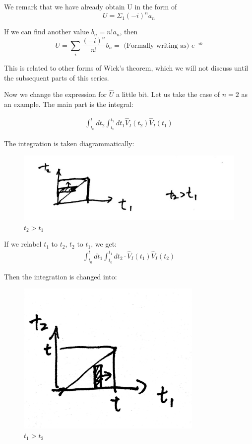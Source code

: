 \documentclass{article}
\numberwithin{equation}{subsection} %
\begin{document}
    We remark that we have already obtain U in the form of %
    $$U=\Sigma_1 (-i)^n a_n$$
    
    If we can find another value $b_n=n!a_n$, then
    $$U= \sum_i \frac{(-i)^n}{n!}b_n= \text{ (Formally writing as) }e^{-ib}$$
    
    This is related to other forms of Wick's theorem, which we will not discuss until the subsequent parts of this series.
    
    Now we change the expression for $\hat{U}$ a little bit. Let us take the case of $n=2$ as an example. The main part is the integral:
    
    \begin{align} \label{eq:n_is_21} \int_{t_0}^{t}dt_2 \int_{t_0}^{t_2} dt_1 \hat{V}_I(t_2) \hat{V}_I(t_1)
    \end{align}
    
    The integration is taken diagrammatically:

	\begin{figure}[H]
		\centering
		\includegraphics[width=1\textwidth]{figures/1.jpg}
		\caption{$t_2>t_1$}
	\end{figure}

    If we relabel $t_1$ to $t_2$, $t_2$ to $t_1$, we get:
    \begin{align} \label{eq:n_is_22} \int_{t_0}^{t}dt_1 \int_{t_0}^{t_1}dt_2 \cdot \hat{V}_I(t_1) \hat{V}_I(t_2)  
    \end{align}

    Then the integration is changed into:

	\begin{figure}[H]
		\centering
		\includegraphics[width=0.8\textwidth]{figures/2.jpg}
		\caption{$t_1>t_2$}
	\end{figure}
\end{document}
